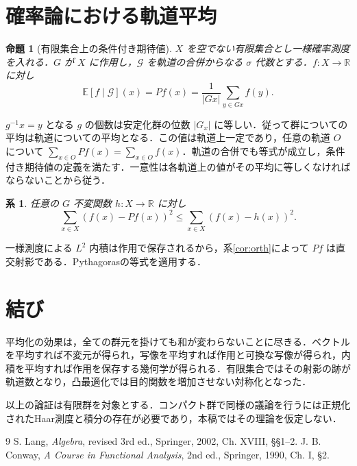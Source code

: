 \documentclass[a5paper,10pt,onecolumn]{jsarticle}
\makeatletter
\theoremstyle{mathnotetheorem}
\newtheorem{proposition}[theorem]{命題}
\newtheorem{corollary}[theorem]{系}
\renewcommand{\proofname}{証明}
\renewenvironment{proof}[1][\proofname]{%
  \par\pushQED{\qed}\normalfont\topsep4\p@\@plus2\p@\relax
  \trivlist\item[\hskip\labelsep\bfseries #1]\ignorespaces
}{\popQED\endtrivlist\@endpefalse}
\newcommand{\R}{\mathbb{R}}
\makeatother
\begin{document}
\section{確率論における軌道平均}
\begin{proposition}[有限集合上の条件付き期待値]
$X$ を空でない有限集合とし一様確率測度を入れる．$G$ が $X$ に作用し，$\mathcal G$ を軌道の合併からなる $\sigma$ 代数とする．$f:X\to\R$ に対し
\[
 \mathbb E[f\mid\mathcal G](x)=Pf(x)
 =\frac1{|Gx|}\sum_{y\in Gx}f(y).
\]
\end{proposition}
\begin{proof}
$g^{-1}x=y$ となる $g$ の個数は安定化群の位数 $|G_x|$ に等しい．従って群についての平均は軌道についての平均となる．この値は軌道上一定であり，任意の軌道 $O$ について $\sum_{x\in O}Pf(x)=\sum_{x\in O}f(x)$．軌道の合併でも等式が成立し，条件付き期待値の定義を満たす．一意性は各軌道上の値がその平均に等しくなければならないことから従う．
\end{proof}
\begin{corollary}
任意の $G$ 不変関数 $h:X\to\R$ に対し
\[
 \sum_{x\in X}(f(x)-Pf(x))^2
 \le\sum_{x\in X}(f(x)-h(x))^2.
\]
\end{corollary}
\begin{proof}
一様測度による $L^2$ 内積は作用で保存されるから，系\ref{cor:orth}によって $Pf$ は直交射影である．Pythagorasの等式を適用する．
\end{proof}

\section{結び}
平均化の効果は，全ての群元を掛けても和が変わらないことに尽きる．ベクトルを平均すれば不変元が得られ，写像を平均すれば作用と可換な写像が得られ，内積を平均すれば作用を保存する幾何学が得られる．有限集合ではその射影の跡が軌道数となり，凸最適化では目的関数を増加させない対称化となった．

以上の論証は有限群を対象とする．コンパクト群で同様の議論を行うには正規化されたHaar測度と積分の存在が必要であり，本稿ではその理論を仮定しない．

\begin{thebibliography}{9}
 S. Lang, \textit{Algebra}, revised 3rd ed., Springer, 2002, Ch. XVIII, \S\S1--2.
 J. B. Conway, \textit{A Course in Functional Analysis}, 2nd ed., Springer, 1990, Ch. I, \S2.
\end{thebibliography}
\end{document}
